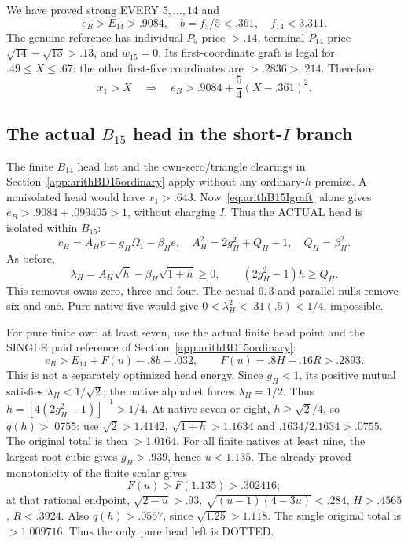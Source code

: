 \documentclass[11pt]{article}
\begin{document}
We have proved strong EVERY \(5,\ldots,14\) and
\[
 e_B>E_{14}>.9084,\quad
 b=f_5/5<.361,\quad f_{14}<3.311 .
\tag{BW}\label{eq:arithB15Iwindow}
\]
The genuine reference has individual \(P_5\) price
\(>.14\), terminal \(P_{14}\) price
\(\sqrt{14}-\sqrt{13}>.13\), and \(w_{15}=0\).
Its first-coordinate graft is legal for
\(.49\le X\le.67\): the other first-five coordinates
are \(>.2836>.214\).
Therefore
\[
             x_1>X\quad\Longrightarrow\quad
             e_B>.9084+{\frac{5}{4}}(X-.361)^2 .
\tag{BG}\label{eq:arithB15Igraft}
\]

\subsection[The actual B15 head in the short-I branch]{The actual \(B_{15}\) head in the short-\(I\) branch}
\label{app:arithB15Ihead}

The finite \(B_{14}\) head list and the own-zero/triangle
clearings in Section~\ref{app:arithBD15ordinary} apply
without any ordinary-\(h\) premise.
A nonisolated head would have \(x_1>.643\).
Now~\eqref{eq:arithB15Igraft} alone gives
\(e_B>.9084+.099405>1\), without charging \(I\).
Thus the ACTUAL head is isolated within \(B_{15}\):
\[
 c_H=A_Hp-g_H\Omega_1-\beta_H e,\quad
 A_H^2=2g_H^2+Q_H-1,\quad Q_H=\beta_H^2 .
\]
As before,
\[
 \lambda_H=A_H\sqrt h-\beta_H\sqrt{1+h}\ge0,\qquad
               (2g_H^2-1)h\ge Q_H .
\]
This removes owns zero, three and four.
The actual \(6,3\) and parallel nulls remove six and one.
Pure native five would give
\(0<\lambda_H^2<.31(.5)<1/4\), impossible.

For pure finite own at least seven, use the actual
finite head point and the SINGLE paid reference
of Section~\ref{app:arithBD15ordinary}:
\[
                e_B>E_{14}+F(u)-.8b+.032,\qquad
                F(u)=.8H-.16R>.2893 .
\]
This is not a separately optimized head energy.
Since \(g_H<1\), its positive mutual satisfies
\(\lambda_H<1/\sqrt2\); the native alphabet forces
\(\lambda_H=1/2\).
Thus \(h=[4(2g_H^2-1)]^{-1}>1/4\).
At native seven or eight,
\(h\ge\sqrt2/4\), so \(q(h)>.0755\):
use \(\sqrt2>1.4142\), \(\sqrt{1+h}>1.1634\)
and \(.1634/2.1634>.0755\).
The original total is then \(>1.0164\).
For all finite natives at least nine,
the largest-root cubic gives \(g_H>.939\), hence \(u<1.135\).
The already proved monotonicity of the finite scalar gives
\[
 F(u)>F(1.135)>.302416;
\]
at that rational endpoint,
\(\sqrt{2-u}>.93\), \(\sqrt{(u-1)(4-3u)}<.284\),
\(H>.4565\), \(R<.3924\).
Also \(q(h)>.0557\), since \(\sqrt{1.25}>1.118\).
The single original total is \(>1.009716\).
Thus the only pure head left is DOTTED.
\end{document}
